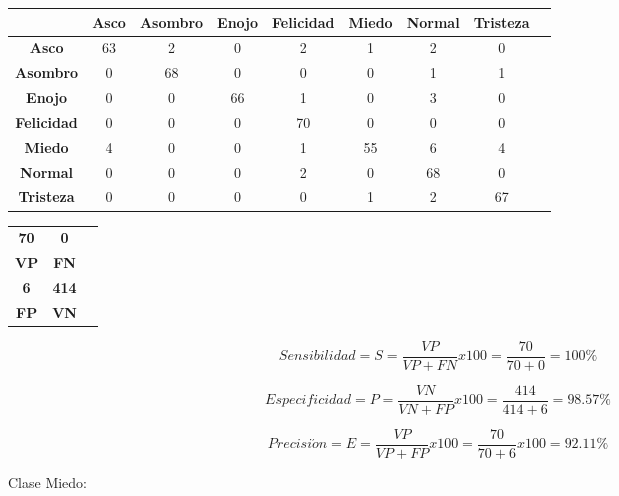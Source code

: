 \begin{table}[ht!]
\centering
\begin{tabular}{|c|c|c|c|c|c|c|c|c|} \hline
 & \bf Asco & \bf Asombro & \bf Enojo & \bf Felicidad & \bf Miedo & \bf Normal & \bf Tristeza \\ \hline
\bf Asco & 63 & 2 & 0 & 2 & 1 & 2 & 0 \\ \hline
\bf Asombro & 0 & 68 & 0 & 0 & 0 & 1 & 1 \\ \hline
\bf Enojo & 0 & 0 & 66 & 1 & 0 & 3 & 0 \\ \hline
\bf Felicidad & 0 & 0 & 0 & 70 & 0 & 0 & 0 \\ \hline
\bf Miedo & 4 & 0 & 0 & 1 & 55 & 6 & 4 \\ \hline
\bf Normal & 0 & 0 & 0 & 2 & 0 & 68 & 0 \\ \hline
\bf Tristeza & 0 & 0 & 0 & 0 & 1 & 2 & 67 \\ \hline

\end{tabular}
\end{table}

\begin{table}[ht!]
\centering
\begin{tabular}{|c|c|c|} \hline
\bf 70 \par & \bf 0 \par \\
\bf VP & \bf FN \\ \hline
\bf 6 \par & \bf 414 \par \\ 
\bf FP & \bf VN \\ \hline 
\end{tabular}
\end{table}

\begin{equation}
Sensibilidad=S=\frac{VP}{VP+FN}x100=\frac{70}{70+0}=100\%
\end{equation}

\begin{equation}
Especificidad=P=\frac{VN}{VN+FP}x100=\frac{414}{414+6}=98.57\%
\end{equation}

\begin{equation}
Precisi\acute{o}n=E=\frac{VP}{VP+FP}x100=\frac{70}{70+6}x100=92.11\%
\end{equation}

\vskip 5cm

Clase Miedo:

